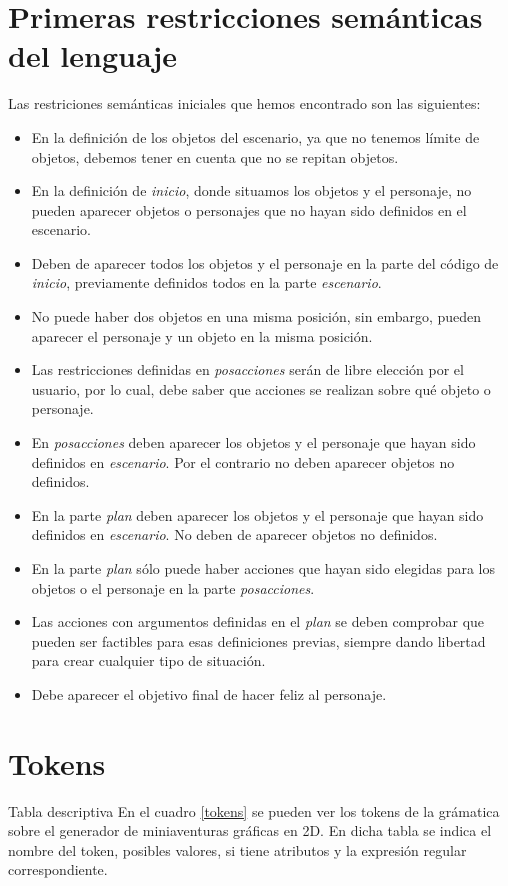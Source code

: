 \documentclass[11pt,a4paper,spanish,twoside]{book}
\makeatletter
\renewcommand{\section}{
  \@startsection{section}{1}{0mm}{\baselineskip}
  {2.5mm}{\Large\bf}
}
\theoremstyle{plain} \newtheorem{nota}{Nota}
\makeatother
\begin{document}
{\chapter{Primeras restricciones semánticas del lenguaje}
Las restriciones semánticas iniciales que hemos encontrado son las siguientes:
\begin{itemize}
\item En la definición de los objetos del escenario, ya que no tenemos límite
de objetos, debemos tener en cuenta que no se repitan objetos.
\item En la definición de \emph{inicio}, donde situamos los objetos y el 
personaje, no pueden aparecer objetos o personajes que no hayan sido definidos 
en el escenario.
\item Deben de aparecer todos los objetos y el personaje en la parte del código 
de \emph{inicio}, previamente definidos todos en la parte \emph{escenario}.
\item No puede haber dos objetos en una misma posición, sin embargo, pueden 
aparecer el personaje y un objeto en la misma posición.
\item Las restricciones definidas en \emph{posacciones} serán de libre elección
por el usuario, por lo cual, debe saber que acciones se realizan sobre qué 
objeto o personaje.
\item En \emph{posacciones} deben aparecer los objetos y el personaje que hayan
sido definidos en \emph{escenario}. Por el contrario no deben aparecer objetos
no definidos.
\item En la parte \emph{plan} deben aparecer los objetos y el personaje que 
hayan sido definidos en \emph{escenario}. No deben de aparecer objetos no 
definidos.
\item En la parte \emph{plan} sólo puede haber acciones que hayan sido elegidas
para los objetos o el personaje en la parte \emph{posacciones}.
\item Las acciones con argumentos definidas en el \emph{plan} se deben comprobar
que pueden ser factibles para esas definiciones previas, siempre dando libertad
para crear cualquier tipo de situación.
\item Debe aparecer el objetivo final de hacer feliz al personaje.
\end{itemize}

\chapter{Tokens}
\section{Tabla descriptiva}
En el cuadro \ref{tokens} se pueden ver los tokens de la grámatica sobre el 
generador de miniaventuras gráficas en 2D. En dicha tabla se indica el nombre 
del token, posibles valores, si tiene atributos y la expresión regular 
correspondiente.

}
\end{document}
